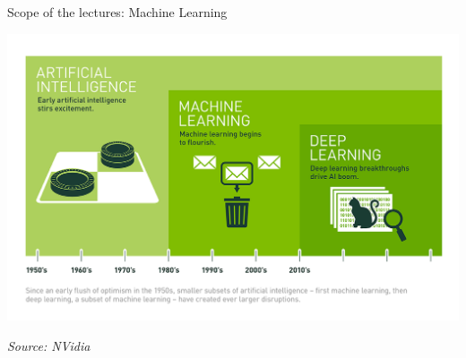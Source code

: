 \documentclass[handout]{beamer}
\newcommand{\rref}[1][]{\hfill{\scriptsize\textit{#1}}}
\begin{document}
\begin{frame}{Scope of the lectures: Machine Learning}
 \begin{center}
     \includegraphics[width=\textwidth]{fig/L1/Deep_Learning_Icons_R5_PNG.png}
 \end{center}
 \rref[Source: NVidia]
 \end{frame}
\end{document}
